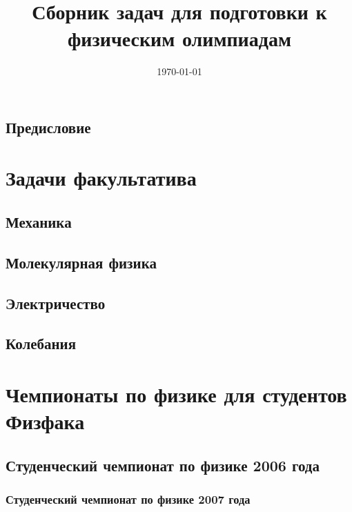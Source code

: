 \documentclass[a5paper, oneside]{book}
\title{Сборник задач для подготовки к физическим олимпиадам}
\date{\today}
\begin{document}
\maketitle
\tableofcontents    %

\chapter*{Предисловие} 


\part{Задачи факультатива}

\chapter{Механика}









\chapter{Молекулярная физика}



\chapter{Электричество}




\chapter{Колебания}


\part{Чемпионаты по физике для студентов Физфака}

\chapter{Студенческий чемпионат по физике 2006 года}


\section*{Студенческий чемпионат по физике 2007 года}

\end{document}

